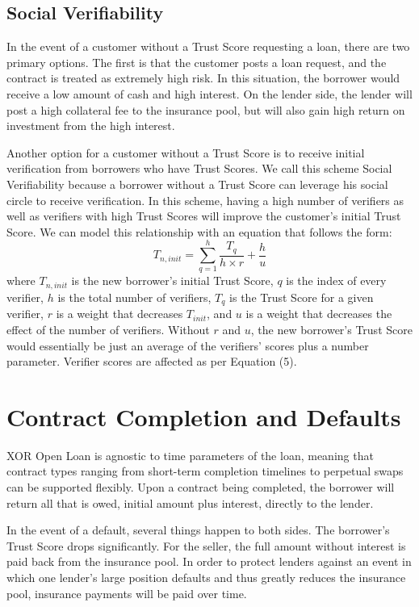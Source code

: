 \documentclass[twoside]{article}
\begin{document}
\subsection{Social Verifiability}
In the event of a customer without a Trust Score requesting a loan, there are two primary options. The first is that the customer posts a loan request, and the contract is treated as extremely high risk. In this situation, the borrower would receive a low amount of cash and high interest. On the lender side, the lender will post a high collateral fee to the insurance pool, but will also gain high return on investment from the high interest. 

Another option for a customer without a Trust Score is to receive initial verification from borrowers who have Trust Scores. We call this scheme Social Verifiability because a borrower without a Trust Score can leverage his social circle to receive verification. In this scheme, having a high number of verifiers as well as verifiers with high Trust Scores will improve the customer's initial Trust Score. We can model this relationship with an equation that follows the form: 
\begin{equation}
T_{n,init} = \sum\limits_{q=1}^h \frac{T_{q}}{h\times r} + \frac{h}{u}
\end{equation}
where $T_{n,init}$ is the new borrower's initial Trust Score, $q$ is the index of every verifier, $h$ is the total number of verifiers, $T_{q}$ is the Trust Score for a given verifier, $r$ is a weight that decreases $T_{init}$, and $u$ is a weight that decreases the effect of the number of verifiers. Without $r$ and $u$, the new borrower's Trust Score would essentially be just an average of the verifiers' scores plus a number parameter. Verifier scores are affected as per Equation (5). 

\section{Contract Completion and Defaults}
XOR Open Loan is agnostic to time parameters of the loan, meaning that contract types ranging from short-term completion timelines to perpetual swaps can be supported flexibly. Upon a contract being completed, the borrower will return all that is owed, initial amount plus interest, directly to the lender. 

In the event of a default, several things happen to both sides. The borrower's Trust Score drops significantly. For the seller, the full amount without interest is paid back from the insurance pool. In order to protect lenders against an event in which one lender's large position defaults and thus greatly reduces the insurance pool, insurance payments will be paid over time. 
\end{document}
